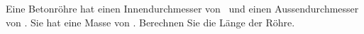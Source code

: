 Eine Betonröhre hat einen Innendurchmesser von \dInO\ und einen Aussendurchmesser von \dAuO. Sie hat eine Masse von \mBeO. Berechnen Sie die Länge der Röhre.
